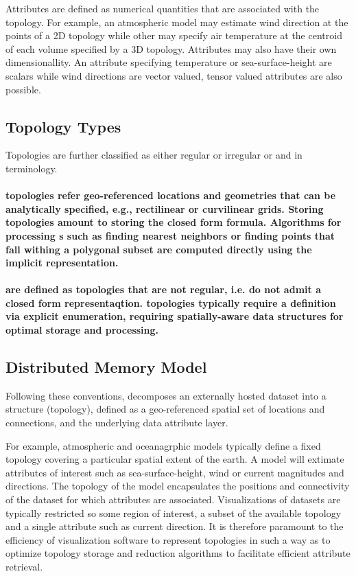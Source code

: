 Attributes are defined as numerical quantities that are associated
with the topology. For example, an atmospheric model may estimate wind
direction at the points of a 2D topology while other may specify air
temperature at the centroid of each volume specified by a 3D
topology. Attributes may also have their own dimensionallity. An
attribute specifying temperature or sea-surface-height are scalars
while wind directions are vector valued, tensor valued attributes are
also possible.



\subsection{Topology Types}
Topologies are further classified as either regular or irregular or
{\bf \cgrid{}} and {\bf \ugrid} in \sciwms{} terminology.
\paragraph{{\bf \cgrid{}} topologies refer geo-referenced locations and geometries that can be analytically specified, e.g., rectilinear
or curvilinear grids. Storing \cgrid{} topologies amount to storing
the closed form formula. Algorithms for processing \cgrid{}s such as
finding nearest neighbors or finding points that fall withing a
polygonal subset are computed directly using the implicit \cgrid{}
representation.}

\paragraph{{\bf \ugrid{}} are defined as topologies that are not regular, i.e. do not admit a closed form representaqtion. \ugrid{} topologies typically require a definition via explicit enumeration, requiring spatially-aware data structures for optimal storage and processing.}

\subsection{Distributed Memory Model}
Following these conventions, \sciwms{} decomposes an externally hosted
dataset into a structure (topology), defined as a geo-referenced
spatial set of locations and connections, and the underlying data
attribute layer.

For example, atmospheric and oceanagrphic models typically define a
fixed topology covering a particular spatial extent of the earth. A
model will extimate attributes of interest such as sea-surface-height,
wind or current magnitudes and directions. The topology of the model
encapsulates the positions and connectivity of the dataset for which
attributes are associated. Visualizations of datasets are typically
restricted so some region of interest, a subset of the available
topology and a single attribute such as current direction. It is
therefore paramount to the efficiency of visualization software to
represent topologies in such a way as to optimize topology storage and
reduction algorithms to facilitate efficient attribute retrieval.


